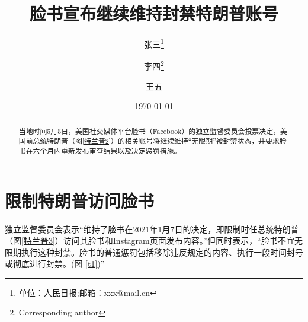 \documentclass[a4paper,11pt]{ctexart}
\title{\heiti 脸书宣布继续维持封禁特朗普账号}
\author{张三\thanks{单位：人民日报;邮箱：xxx@mail.cn} \and 李四\thanks{Corresponding author} \and 王五}
\date{\today}
\begin{document}
	\maketitle
	
	\begin{abstract}
		\large
		{\kaishu 当地时间5月5日，美国社交媒体平台脸书（Facebook）的独立监督委员会投票决定，美国前总统特朗普（图\ref{特兰普2}）的相关账号将继续维持“无限期”被封禁状态，并要求脸书在六个月内重新发布审查结果以及决定惩罚措施。}
	\end{abstract}
	\vspace{1cm}
	\tableofcontents
%	
	\listoffigures
	\listoftables
	
	\newpage
	
	\section{限制特朗普访问脸书}
	{\kaishu 独立监督委员会表示“维持了脸书在2021年1月7日的决定，即限制时任总统特朗普（图\ref{特兰普3}）访问其脸书和Instagram页面发布内容。”但同时表示，“脸书不宜无限期执行这种封禁。脸书的普通惩罚包括移除违反规定的内容、执行一段时间封号或彻底进行封禁。(图 \ref{t1})”}
\end{document}

